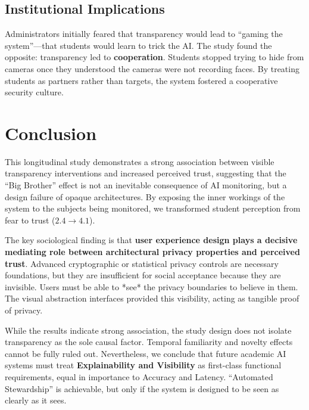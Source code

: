 \documentclass[conference]{IEEEtran}
\begin{document}
\subsection{Institutional Implications}
Administrators initially feared that transparency would lead to ``gaming the system''---that students would learn to trick the AI. The study found the opposite: transparency led to \textbf{cooperation}. Students stopped trying to hide from cameras once they understood the cameras were not recording faces. By treating students as partners rather than targets, the system fostered a cooperative security culture.

\section{Conclusion}
This longitudinal study demonstrates a strong association between visible transparency interventions and increased perceived trust, suggesting that the ``Big Brother'' effect is not an inevitable consequence of AI monitoring, but a design failure of opaque architectures. By exposing the inner workings of the system to the subjects being monitored, we transformed student perception from fear to trust ($2.4 \to 4.1$).

The key sociological finding is that \textbf{user experience design plays a decisive mediating role between architectural privacy properties and perceived trust}. Advanced cryptographic or statistical privacy controls are necessary foundations, but they are insufficient for social acceptance because they are invisible. Users must be able to *see* the privacy boundaries to believe in them. The visual abstraction interfaces provided this visibility, acting as tangible proof of privacy. 

While the results indicate strong association, the study design does not isolate transparency as the sole causal factor. Temporal familiarity and novelty effects cannot be fully ruled out. Nevertheless, we conclude that future academic AI systems must treat \textbf{Explainability and Visibility} as first-class functional requirements, equal in importance to Accuracy and Latency. ``Automated Stewardship'' is achievable, but only if the system is designed to be seen as clearly as it sees.
\end{document}
